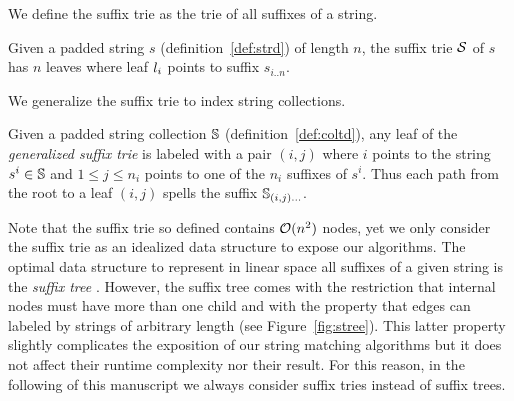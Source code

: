 We define the suffix trie as the trie of all suffixes of a string.
\begin{definition}
Given a padded string $s$ (definition~\ref{def:strd}) of length $n$, the suffix trie $\mathcal {S}$ of $s$ has $n$ leaves where leaf $l_i$ points to suffix $s_{i..n}$.
\end{definition}
We generalize the suffix trie to index string collections.
\begin{definition}
Given a padded string collection $\mathbb {S}$ (definition~\ref{def:coltd}), any leaf of the \emph{generalized suffix trie} is labeled with a pair $(i,j)$ where $i$ points to the string $s^i \in \mathbb {S}$ and $1 \leq j \leq n_i$ points to one of the $n_i$ suffixes of $s^i$.
Thus each path from the root to a leaf $(i,j)$ spells the suffix $\mathbb {S}_{(i,j) \dots}$.
\end{definition}

Note that the suffix trie so defined contains $\mathcal{O}(n^2)$ nodes, yet we only consider the suffix trie as an idealized data structure to expose our algorithms.
The optimal data structure to represent in linear space all suffixes of a given string is the \emph{suffix tree} \citep{Morrison1968}.
However, the suffix tree comes with the restriction that internal nodes must have more than one child and with the property that edges can labeled by strings of arbitrary length (see Figure~\ref{fig:stree}).
This latter property slightly complicates the exposition of our string matching algorithms but it does not affect their runtime complexity nor their result.
For this reason, in the following of this manuscript we always consider \wlogs suffix tries instead of suffix trees.

\begin{figure}[h]
\caption[Example of suffix trie and suffix tree]{Suffix trie and suffix tree for the string ANANAS\$.}
\label{fig:stree}
\begin{subfigure}{.5\textwidth}
\begin{center}

\end{center}
\end{subfigure}%
\begin{subfigure}{.5\textwidth}
\begin{center}

\end{center}
\end{subfigure}
\end{figure}

